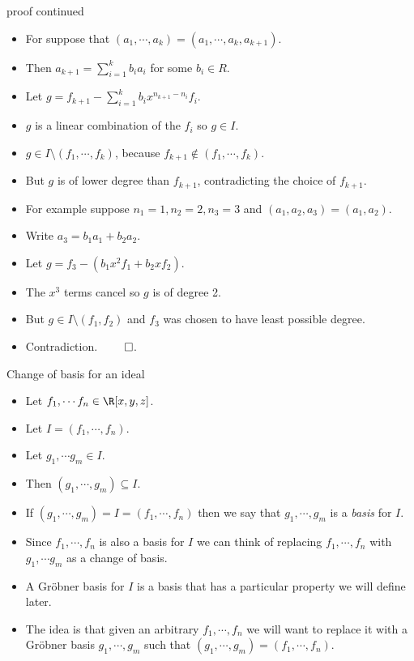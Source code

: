 \documentclass{beamer}
\begin{document}

\begin{frame}{proof continued}

\begin{itemize}
  \item For suppose that $(a_1,\cdots, a_k) = (a_1,\cdots, a_k, a_{k+1})$.
  \item Then $a_{k+1} = \sum_{i=1}^k b_i a_i$ for some $b_i\in R$.
  \item Let $g=f_{k+1} - \sum_{i=1}^kb_i x^{n_{k+1} - n_i} f_i$.
  \item $g$ is a linear combination of the $f_i$ so $g\in I$.
  \item $g \in I \setminus (f_1,\cdots,f_k)$, because $f_{k+1} \notin (f_1,\cdots,f_k)$.
  \item But $g$ is of
  lower degree than $f_{k+1}$, contradicting the choice of $f_{k+1}$.
  \item For example suppose $n_1 = 1, n_2 =2, n_3 = 3$ and $(a_1,a_2,a_3) = (a_1, a_2)$.
  \item Write $a_3 = b_1 a_1 + b_2 a_2$.
  \item Let $g=f_3 - (b_1 x^2 f_1 + b_2 x f_2)$.
  \item The $x^3$ terms cancel so $g$ is of degree 2.
  \item But $g \in I \setminus (f_1, f_2)$ and $f_3$ was chosen to have least possible degree.
  \item Contradiction. $\qed$.
\end{itemize}
\end{frame}


\begin{frame}{Change of basis for an ideal}

\begin{itemize}
  \item Let $f_1,\cdots f_n \in \R[x,y,z]$.
  \item Let $I=(f_1, \cdots, f_n)$.
  \item Let $g_1,\cdots g_m \in I$.
  \item Then $(g_1,\cdots, g_m) \subseteq I$.
  \item If $(g_1,\cdots, g_m) = I = (f_1, \cdots, f_n)$ then we say that $g_1,\cdots, g_m$ is a \emph{basis} for $I$.
  \item Since $f_1,\cdots,f_n$ is also a basis for $I$ we can think of replacing $f_1,\cdots,f_n$ with $g_1,\cdots g_m$
  as a change of basis.
  \item A Gr\"{o}bner basis for $I$ is a basis that has a particular property we will define later.
  \item The idea is that given an arbitrary $f_1, \cdots, f_n$ we will want to replace it with a Gr\"{o}bner basis $g_1,\cdots, g_m$
  such that $(g_1,\cdots, g_m) = (f_1, \cdots, f_n)$.
\end{itemize}
\end{frame}
\end{document}
